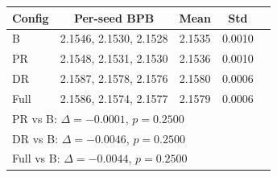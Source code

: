 \begin{tabular}{l c c c c}
\toprule
Config & Per-seed BPB & Mean & Std \\
\midrule
B & 2.1546, 2.1530, 2.1528 & 2.1535 & 0.0010 \\
PR & 2.1548, 2.1531, 2.1530 & 2.1536 & 0.0010 \\
DR & 2.1587, 2.1578, 2.1576 & 2.1580 & 0.0006 \\
Full & 2.1586, 2.1574, 2.1577 & 2.1579 & 0.0006 \\
\midrule
\multicolumn{3}{l}{PR vs B: $\Delta=-0.0001$, $p=0.2500$} \\
\multicolumn{3}{l}{DR vs B: $\Delta=-0.0046$, $p=0.2500$} \\
\multicolumn{3}{l}{Full vs B: $\Delta=-0.0044$, $p=0.2500$} \\
\bottomrule
\end{tabular}